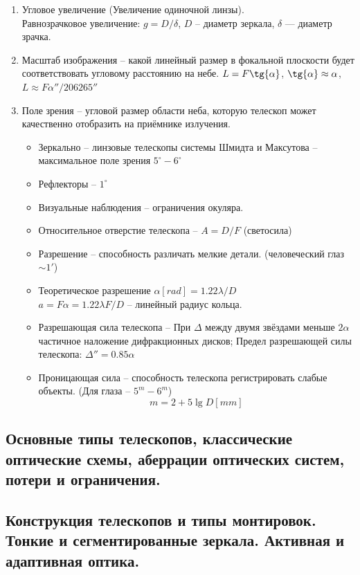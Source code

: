 \documentclass[12pt]{article}
\begin{document}
	\begin{enumerate}
		\item Угловое увеличение (Увеличение одиночной линзы).\\
		Равнозрачковое увеличение: $g = D/\delta$, $D$ -- диаметр зеркала, $\delta$ — диаметр зрачка.		
		\item Масштаб изображения -- какой линейный размер в
		фокальной плоскости будет соответствовать угловому
		расстоянию на небе. $L = F \tg{\alpha}$, $\tg{\alpha} \approx \alpha$, $L \approx F \alpha''/ 206265''$
		\item Поле зрения -- угловой размер области неба,
		которую телескоп может качественно отобразить на
		приёмнике излучения.
			\begin{itemize}
				\item Зеркально -- линзовые телескопы системы
				Шмидта и Максутова -- максимальное поле
				зрения $5^{\circ} - 6^{\circ}$
				\item Рефлекторы -- $1^{\circ}$
				\item Визуальные наблюдения -- ограничения окуляра.
				\item Относительное отверстие телескопа -- $A = D/F$ (светосила)
				\item Разрешение -- способность различать
				мелкие детали. (человеческий глаз $\sim1'$)
				\item Теоретическое разрешение $\alpha[rad] = 1.22 \lambda/D$\\
				$a = F\alpha = 1.22 \lambda F/D$ -- линейный радиус кольца.
				\item Разрешающая сила телескопа -- 
				При $\Delta$ между двумя звёздами меньше $2\alpha$
				частичное наложение дифракционных дисков;
				Предел разрешающей силы телескопа:
				$\Delta'' = 0.85 \alpha$
				\item Проницающая сила – способность телескопа
				регистрировать слабые объекты. (Для глаза – $5^{m} - 6^{m}$)
				$$m = 2 + 5\lg D [mm]$$
			\end{itemize}
			
	\end{enumerate}
	
	
	\subsection{Основные типы телескопов, классические оптические схемы, аберрации оптических систем, потери и ограничения.}
	\subsection{Конструкция телескопов и типы монтировок. Тонкие и сегментированные зеркала. Активная и адаптивная оптика.}
\end{document}
